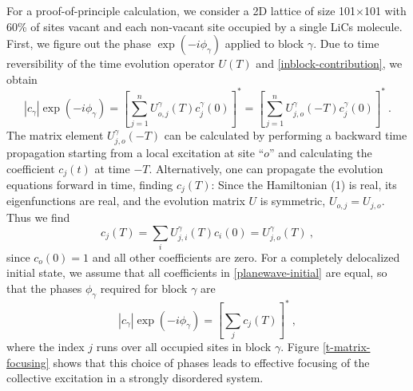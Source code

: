 For a proof-of-principle calculation, we consider a 2D lattice of size 101$\times$101 with 60\% of sites vacant and 
each non-vacant site occupied by a single LiCs molecule. 
First, we figure out the phase $\exp(-i\phi_{\gamma})$ applied to block $\gamma$.  Due to time reversibility of the time
evolution operator $U(T)$ and \autoref{inblock-contribution}, we obtain 
\begin{equation}
|c_\gamma | \exp(-i \phi_{\gamma}) = \left[ \sum_{j=1}^{n} U_{o, j}^\gamma (T) c_j^{\gamma}(0)\right]^* 
=\left[ \sum_{j=1}^{n} U_{j, o}^\gamma (-T) c_j^{\gamma}(0)\right]^* \ . \label{eqn:backInTime}
\end{equation}
The matrix element $U_{j, o}^\gamma (-T)$ can be
calculated by performing a backward time propagation starting from a
local excitation at site ``$o$'' and calculating the coefficient
$c_j(t)$ at time $-T$. 
Alternatively, one can propagate the evolution equations forward in time, finding $c_j(T)$: 
Since the Hamiltonian (1) is real, its eigenfunctions are real, and the evolution matrix $U$ is symmetric, $U_{o, j} = U_{j, o}$. Thus we find
\begin{equation}
c_j(T) = \sum_{i}U_{j, i}^\gamma (T) c_i(0) = U_{j, o}^\gamma (T) \ ,
\end{equation}
since $c_{o}(0) = 1$ and all other coefficients are zero. For a completely delocalized initial state, we assume that all coefficients
in \autoref{planewave-initial} are equal, so that  the phases $\phi_\gamma$ required for
block $\gamma$ are
\begin{equation}
 |c_\gamma|\exp(- i \phi_{\gamma})  = \left[ \sum_{j}  c_j(T) \right]^* \ , \label{phase-applied}
\end{equation}
where the index $j$ runs over all  occupied sites in block $\gamma$.
Figure \ref{t-matrix-focusing} shows that this choice of phases leads to effective focusing of the collective excitation in a strongly disordered system. 

